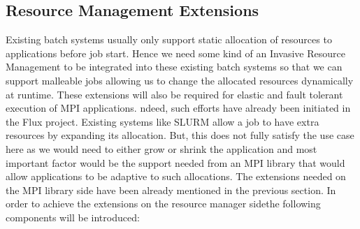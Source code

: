 \subsection{Resource Management Extensions}
Existing batch systems usually only support static allocation of resources to applications before job start. Hence we need some kind of an Invasive Resource Management to be integrated into these existing batch systems so that we can support malleable jobs allowing us to change the allocated resources dynamically at runtime. These extensions will also be required for elastic and fault tolerant execution of MPI applications. ndeed, such efforts have already been initiated in the Flux project. Existing systems like SLURM allow a job to have extra resources by expanding its allocation. But, this does not fully satisfy the use case here as we would need to either grow or shrink the application and most important factor would be the support needed from an MPI library that would allow applications to be adaptive to such allocations. The extensions needed on the MPI library side have been already mentioned in the previous section. In order to achieve the extensions on the resource manager sidethe following components will be introduced:
